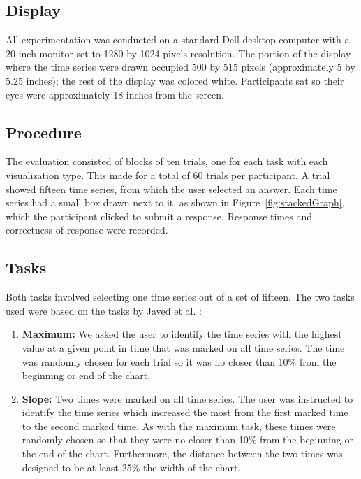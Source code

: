 \documentclass{article}
\begin{document}
\subsection{Display}

All experimentation was conducted on a standard Dell desktop computer with a 20-inch monitor set to 1280 by 1024 pixels resolution.  The portion of the display where the time series were drawn occupied 500 by 515 pixels (approximately 5 by 5.25 inches); the rest of the display was colored white.  Participants sat so their eyes were approximately 18 inches from the screen.

\subsection{Procedure}

The evaluation consisted of blocks of ten trials, one for each task with each visualization type.  This made for a total of 60 trials per participant.  A trial showed fifteen time series, from which the user selected an answer.  Each time series had a small box drawn next to it, as shown in Figure~\ref{fig:stackedGraph}, which the participant clicked to submit a response.  Response times and correctness of response were recorded.

\subsection{Tasks}

Both tasks involved selecting one time series out of a set of fifteen.  The two tasks used were based on the tasks by Javed et al. \cite{javed2010}:
\begin{enumerate}
\item \textbf{Maximum:} We asked the user to identify the time series with the highest value at a given point in time that was marked on all time series.  The time was randomly chosen for each trial so it was no closer than 10\% from the beginning or end of the chart.
\item \textbf{Slope:} Two times were marked on all time series.  The user was instructed to identify the time series which increased the most from the first marked time to the second marked time.  As with the maximum task, these times were randomly chosen so that they were no closer than 10\% from the beginning or the end of the chart.  Furthermore, the distance between the two times was designed to be at least 25\% the width of the chart.
\end{enumerate}
\end{document}
